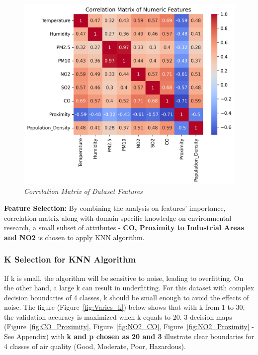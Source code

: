 \documentclass[10pt,twocolumn]{article}
\begin{document}
\begin{figure}[h!]
    \centering
    \includegraphics[width=\linewidth]{correlation_matrix.png}
    \caption{\textit{Correlation Matrix of Dataset Features}}
    \label{fig:correlation_matrix}
\end{figure}

\textbf{Feature Selection:} By combining the analysis on features' importance, correlation matrix along with domain specific knowledge on environmental research, a small subset of attributes - \textbf{CO, Proximity to Industrial Areas and NO2} is chosen to apply KNN algorithm.

\subsubsection{K Selection for KNN Algorithm}
If k is small, the algorithm will be sensitive to noise, leading to overfitting. On the other hand, a large k can result in underfitting. \cite{laviale2023}
For this dataset with complex decision boundaries of 4 classes, k should be small enough to avoid the effects of noise. The figure (Figure~\ref{fig:Varies_k}) below shows that with k from 1 to 30, the validation accuracy is maximized when k equals to 20. 3 decision maps (Figure~\ref{fig:CO_Proximity}, Figure~\ref{fig:NO2_CO}, Figure~\ref{fig:NO2_Proximity} - See Appendix) with \textbf{k and p chosen as 20 and 3} illustrate clear boundaries for 4 classes of air quality (Good, Moderate, Poor, Hazardous).
\end{document}
